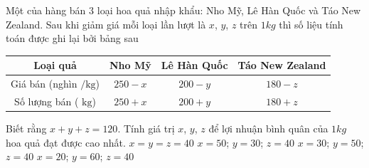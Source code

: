 \begin{ex}%
	Một của hàng bán $3$ loại hoa quả nhập khẩu: Nho Mỹ, Lê Hàn Quốc và Táo New Zealand. Sau khi giảm giá mỗi loại lần lượt  là $x$, $y$, $z$ trên $1kg$ thì số liệu tính toán được ghi lại bởi bảng sau
	\begin{center}
		\begin{tabular}{|c|c|c|c|}
			\hline Loại quả & Nho Mỹ & Lê Hàn Quốc & Táo  New Zealand \\
			\hline Giá bán (nghìn $/ \mathrm{kg}$)  & $250-x$ & $200-y$ & $180-z$ \\
			\hline Số  lượng bán ( $\mathrm{kg}$) & $250+x$ & $200+y$ & $180+z$ \\
			\hline 
		\end{tabular}
	\end{center}
	Biết rằng $x+y+z=120$. Tính giá trị $x$, $y$, $z$ để  lợi nhuận bình quân của $1kg$ hoa quả đạt được cao nhất.
	 \choice
		{\True  $x=y=z=40$}
		{$x=50$; $y=30$;  $z=40$}
		{$x=30$; $y=50$;  $z=40$}
		 {$x=20$; $y=60$; $z=40$}
\end{ex}



